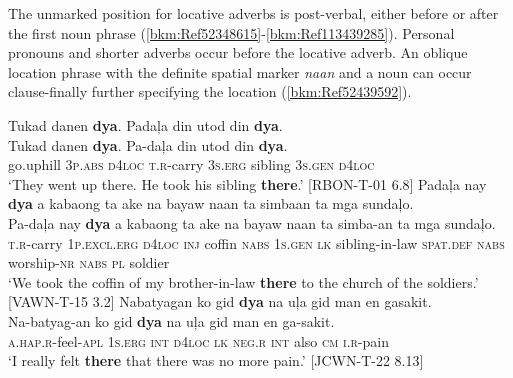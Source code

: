 The unmarked position for locative adverbs is post-verbal, either before or after the first noun phrase (\ref{bkm:Ref52348615}{}-\ref{bkm:Ref113439285}). Personal pronouns and shorter adverbs occur before the locative adverb. An oblique location phrase with the definite spatial marker \textit{naan} and a noun can occur clause-finally further specifying the location (\ref{bkm:Ref52439592}).

\ea
\label{bkm:Ref52348615}
Tukad  danen  \textbf{dya}.  Padaļa  din  utod  din  \textbf{dya}. \\\smallskip
 \gll Tukad  danen  \textbf{dya}.  Pa-daļa  din  utod  din  \textbf{dya}. \\
go.uphill  3\textsc{p.abs}  \textsc{d}4\textsc{loc}  \textsc{t.r}-carry  3\textsc{s.erg}  sibling  3\textsc{s.gen}  \textsc{d}4\textsc{loc} \\
\glt ‘They went up there. He took his sibling \textbf{there}.’ [RBON-T-01 6.8]
\z
\ea
Padaļa  nay  \textbf{dya}  a  kabaong  ta  ake  na  bayaw naan  ta  simbaan  ta  mga  sundaļo. \\\smallskip
 \gll Pa-daļa  nay  \textbf{dya}  a  kabaong  ta  ake  na  bayaw naan  ta  simba-an  ta  mga  sundaļo. \\
\textsc{t.r}-carry  1\textsc{p.excl.erg}  \textsc{d}4\textsc{loc}  \textsc{inj}  coffin  \textsc{nabs}  1\textsc{s.gen}  \textsc{lk}  sibling-in-law
\textsc{spat.def}  \textsc{nabs}  worship-\textsc{nr}  \textsc{nabs}  \textsc{pl}  soldier \\
\glt `We took the coffin of my brother-in-law \textbf{there} to the church of the soldiers.’ [VAWN-T-15 3.2]
\z
\ea
\label{bkm:Ref113439285}
Nabatyagan  ko  gid  \textbf{dya}  na  uļa  gid  man  en  gasakit. \\\smallskip
 \gll Na-batyag-an  ko  gid  \textbf{dya}  na  uļa  gid  man  en  ga-sakit. \\
\textsc{a.hap.r-}feel-\textsc{apl}  1\textsc{s.erg}  \textsc{int}  \textsc{d}4\textsc{loc}   \textsc{lk}  \textsc{neg.r}  \textsc{int}  also  \textsc{cm}  \textsc{i.r}-pain \\
\glt ‘I really felt \textbf{there} that there was no more pain.’ [JCWN-T-22 8.13]
\z

